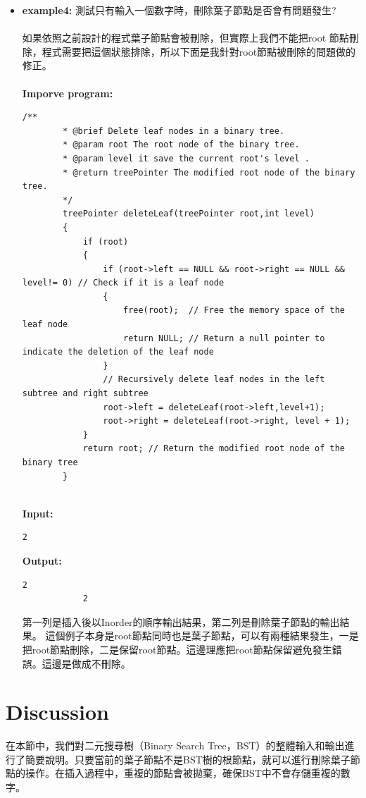 \documentclass{article}
\begin{document}
\begin{itemize}
		\item \textbf{example4:} 測試只有輸入一個數字時，刪除葉子節點是否會有問題發生?\\
		\\
		如果依照之前設計的程式葉子節點會被刪除，但實際上我們不能把root 節點刪除，程式需要把這個狀態排除，所以下面是我針對root節點被刪除的問題做的修正。
		\\ \\
		\textbf{Imporve program:}
		\begin{lstlisting}[style=Cstyle]
		/**
		* @brief Delete leaf nodes in a binary tree.
		* @param root The root node of the binary tree.
		* @param level it save the current root's level . 
		* @return treePointer The modified root node of the binary tree.  
		*/
		treePointer deleteLeaf(treePointer root,int level)
		{
			if (root)
			{
				if (root->left == NULL && root->right == NULL && level!= 0) // Check if it is a leaf node
				{
					free(root);  // Free the memory space of the leaf node
					return NULL; // Return a null pointer to indicate the deletion of the leaf node
				}
				// Recursively delete leaf nodes in the left subtree and right subtree
				root->left = deleteLeaf(root->left,level+1);
				root->right = deleteLeaf(root->right, level + 1);
			}
			return root; // Return the modified root node of the binary tree
		}
		
		\end{lstlisting}
		\textbf{Input:}
		\begin{lstlisting}[style=Cstyle]
			2
		\end{lstlisting}
		
		\textbf{Output:}
		\begin{lstlisting}[style=Cstyle]
			2
			2
		\end{lstlisting}
		第一列是插入後以Inorder的順序輸出結果，第二列是刪除葉子節點的輸出結果。
		這個例子本身是root節點同時也是葉子節點，可以有兩種結果發生，一是把root節點刪除，二是保留root節點。這邊理應把root節點保留避免發生錯誤。這邊是做成不刪除。

		

	\end{itemize}
	
	
	\section{Discussion}

	在本節中，我們對二元搜尋樹（Binary Search Tree，BST）的整體輸入和輸出進行了簡要說明。只要當前的葉子節點不是BST樹的根節點，就可以進行刪除葉子節點的操作。在插入過程中，重複的節點會被拋棄，確保BST中不會存儲重複的數字。
\end{document}
